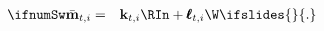 \begin{eqnarray}
\ifnumSw  \bar{\mathbf{m}}_{t,i} & = & \mathbf{k}_{t,i} \RIn + \mathbf{\pmb{\ell}}_{t,i} \W \label{eq:mFLess}
\ifslides{}{.}
\end{eqnarray}
